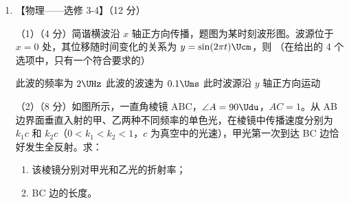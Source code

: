 \documentclass[\gkver]{gaokaozhenti}
\begin{document}
\begin{enumerate}
\item
【物理——选修 3-4】（12 分）

（1）（4 分）简谐横波沿 $x$ 轴正方向传播，题图为某时刻波形图。波源位于 $x=0$ 处，其位移随时间变化的关系为 $y=\sin(2\pi t)\Ucm$，则 （在给出的 4 个选项中，只有一个符合要求的）


{此波的频率为 $2\UHz$}
{此波的波速为 $0.1\Ums$}
{此时波源沿 $y$ 轴正方向运动}

（2）（8 分）如图所示，一直角棱镜 ABC，$\angle A=90\Udu$，$AC=1$。从 AB 边界面垂直入射的甲、乙两种不同频率的单色光，在棱镜中传播速度分别为 $k_{1}c$ 和 $k_{2}c$（$0<k_{1}<k_{2}<1$，$c$ 为真空中的光速），甲光第一次到达 BC 边恰好发生全反射。求：
\begin{enumerate}
	\item
	该棱镜分别对甲光和乙光的折射率；
	\item
	BC 边的长度。
\end{enumerate}
\onepicture[align=right, w=4.12cm]{}


\end{enumerate}
\end{document}
